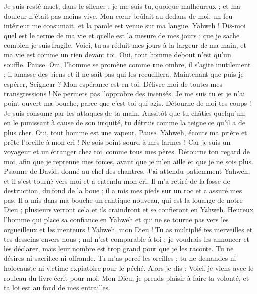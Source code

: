 \begin{multicols}{2}
Je suis resté muet, dans le silence ; je me suis tu, quoique malheureux ; et ma douleur n’était pas moins vive.
Mon cœur brûlait au-dedans de moi, un feu intérieur me consumait, et la parole est venue sur ma langue.
Yahweh ! Dis-moi quel est le terme de ma vie et quelle est la mesure de mes jours ; que je sache combien je suis fragile.
Voici, tu as réduit mes jours à la largeur de ma main, et ma vie est comme un rien devant toi. Oui, tout homme debout n’est qu’un souffle. Pause.
Oui, l'homme se promène comme une ombre, il s'agite inutilement ; il amasse des biens et il ne sait pas qui les recueillera.
Maintenant que puis-je espérer, Seigneur ? Mon espérance est en toi.
Délivre-moi de toutes mes transgressions ! Ne permets pas l’opprobre des insensés.
Je me suis tu et je n'ai point ouvert ma bouche, parce que c'est toi qui agis.
Détourne de moi tes coups ! Je suis consumé par les attaques de ta main.
Aussitôt que tu châties quelqu'un, en le punissant à cause de son iniquité, tu détruis comme la teigne ce qu’il a de plus cher. Oui, tout homme est une vapeur. Pause.
Yahweh, écoute ma prière et prête l'oreille à mon cri ! Ne sois point sourd à mes larmes ! Car je suis un voyageur et un étranger chez toi, comme tous mes pères.
Détourne ton regard de moi, afin que je reprenne mes forces, avant que je m'en aille et que je ne sois plus.
\VerseOne{}Psaume de David, donné au chef des chantres.
J'ai attendu patiemment Yahweh, et il s'est tourné vers moi et a entendu mon cri.
Il m'a retiré de la fosse de destruction, du fond de la boue ; il a mis mes pieds sur un roc et a assuré mes pas.
Il a mis dans ma bouche un cantique nouveau, qui est la louange de notre Dieu ; plusieurs verront cela et ils craindront et se confieront en Yahweh.
Heureux l'homme qui place sa confiance en Yahweh et qui ne se tourne pas vers les orgueilleux et les menteurs !
Yahweh, mon Dieu ! Tu as multiplié tes merveilles et tes desseins envers nous ; nul n’est comparable à toi ; je voudrais les annoncer et les déclarer, mais leur nombre est trop grand pour que je les raconte.
Tu ne désires ni sacrifice ni offrande. Tu m'as percé les oreilles ; tu ne demandes ni holocauste ni victime expiatoire pour le péché.
Alors je dis : Voici, je viens avec le rouleau du livre écrit pour moi.
Mon Dieu, je prends plaisir à faire ta volonté, et ta loi est au fond de mes entrailles.

\end{multicols}
